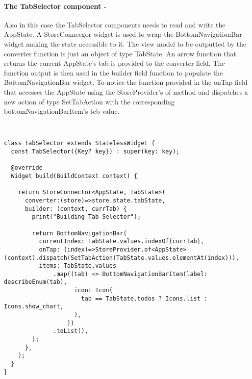 \paragraph{The TabSelector component - }
\label{subpar:todo_app_bloc_core_state}
Also in this case the TabSelector components needs to read and write the AppState. A StoreConnecgor widget is used to wrap the BottomNavigationBar widget making the state accessible to it. The view model to be outputted by the converter function is just an object of type TabState. An arrow function that returns the current AppState’s tab is provided to the converter field. The function output is then used in the builder field function to populate the BottomNavigationBar widget. To notice the function provided in the onTap field that accesses the AppState using the StoreProvider’s of method and dispatches a new action of type SetTabAction with the corresponding bottomNavigationBarItem’s teb value.
\begin{code}
\mbox{}\\
 \mbox{}
		\label{code:2.14}
\begin{verbatim}
class TabSelector extends StatelessWidget {
  const TabSelector({Key? key}) : super(key: key);

  @override
  Widget build(BuildContext context) {

    return StoreConnector<AppState, TabState>(
      converter:(store)=>store.state.tabState,
      builder: (context, currTab) {
        print("Building Tab Selector");

        return BottomNavigationBar(
          currentIndex: TabState.values.indexOf(currTab),
          onTap: (index)=>StoreProvider.of<AppState>(context).dispatch(SetTabAction(TabState.values.elementAt(index))),
          items: TabState.values
              .map((tab) => BottomNavigationBarItem(label: describeEnum(tab),
                    icon: Icon(
                      tab == TabState.todos ? Icons.list : Icons.show_chart,
                    ),
                  ))
              .toList(),
        );
      },
    );
  }
}
\end{verbatim}
\mbox{}
\end{code}

